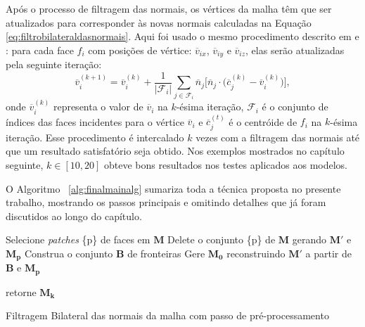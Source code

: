 Após o processo de filtragem das normais, os vértices da malha têm que ser atualizados para corresponder às novas normais calculadas na Equação \ref{eq:filtrobilateraldasnormais}. Aqui foi usado o mesmo procedimento descrito em \cite{zhang2015guided} e \cite{sun2007fast}: para cada face $f_i$ com posições de vértice: $\overline{v}_{ix}$, $\overline{v}_{iy}$ e $\overline{v}_{iz}$, elas serão atualizadas pela seguinte iteração:
\begin{equation}
	\overline{v}^{(k+1)}_{i} = \overline{v}^{(k)}_{i} + \frac{1}{|\mathcal{F}_i|} \sum_{j \in \mathcal{F}_i}{ \overline{n}_j \Big[ \overline{n}_j \cdot \Big( \overline{c}^{(k)}_j - \overline{v}^{(k)}_i \Big) \Big] },
\end{equation}
onde $\overline{v}^{(k)}_{i}$ representa o valor de $\overline{v}_{i}$ na $k$-ésima iteração, $\mathcal{F}_i$ é o conjunto de índices das faces incidentes para o vértice $\overline{v}_{i}$ e $\overline{c}^{(t)}_j$ é o centróide de $f_i$ na $k$-ésima iteração. Esse procedimento é intercalado $k$ vezes com a filtragem das normais até que um resultado satisfatório seja obtido. Nos exemplos mostrados no capítulo seguinte, $k \in [10, 20]$ obteve bons resultados nos testes aplicados aos modelos.

O Algoritmo ~\ref{alg:finalmainalg} sumariza toda a técnica proposta no presente trabalho, mostrando os passos principais e omitindo detalhes que já foram discutidos ao longo do capítulo.

\begin{algorithm}[]
\BlankLine

    Selecione \textit{patches} \{p\} de faces em $\mathbf{M}$\;
    Delete o conjunto \{p\} de $\mathbf{M}$ gerando $\mathbf{M'}$ e $\mathbf{M_p}$\;
    Construa o conjunto $\mathbf{B}$ de fronteiras\;
    Gere $\mathbf{M_0}$ reconstruindo $\mathbf{M'}$ a partir de $\mathbf{B}$ e $\mathbf{M_p}$\;
    
    retorne $\mathbf{M_{k }}$\;
\caption{Filtragem Bilateral das normais da malha com passo de pré-processamento}
\label{alg:finalmainalg}
\end{algorithm}
